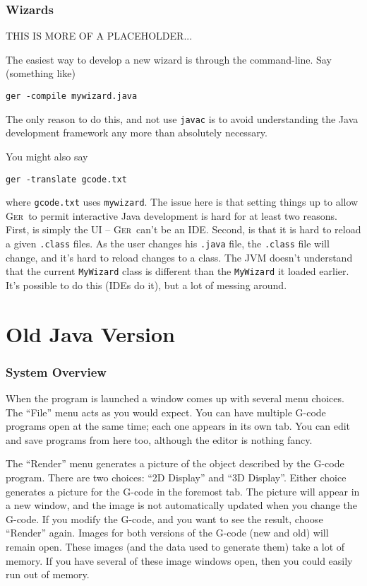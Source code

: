 \documentclass[titlepage,oneside,10pt]{article}
\newcommand{\ger}{\textsc{Ger}}
\begin{document}
\section{Wizards}

THIS IS MORE OF A PLACEHOLDER...

The easiest way to develop a new wizard is through the
command-line. Say (something like)
\begin{verbatim}
ger -compile mywizard.java
\end{verbatim}
The only reason to do this, and not use {\tt javac} is to avoid
understanding the Java development framework any more than absolutely
necessary.

You might also say
\begin{verbatim}
ger -translate gcode.txt
\end{verbatim}
where {\tt gcode.txt} uses {\tt mywizard}. The issue here is that
setting things up to allow \ger\ to permit interactive Java
development is hard for at least two reasons. First, is simply the
UI -- \ger\ can't be an IDE. Second, is that it is hard to reload a
given {\tt .class} files. As the user changes his {\tt .java} file,
the {\tt .class} file will change, and it's hard to reload changes to
a class. The JVM doesn't understand that the current {\tt MyWizard}
class is different than the {\tt MyWizard} it loaded earlier. It's
possible to do this (IDEs do it), but a lot of messing around.


\vskip 2cm





\part{Old Java Version}

\section{System Overview}

When the program is launched a window comes up with several menu
choices. The ``File'' menu acts as you would expect. You can have
multiple G-code programs open at the same time; each one appears in
its own tab. You can edit and save programs from here too, although
the editor is nothing fancy.

The ``Render'' menu generates a picture of the object described by
the G-code program. There are two choices: ``2D Display'' and ``3D
Display''. Either choice generates a picture for the G-code in 
the foremost tab. The picture will appear in a new window, and 
the image is not automatically updated when you change the
G-code. If you modify the G-code, and you want to see the result,
choose ``Render'' again. Images for both versions of the G-code (new
and old) will remain open. These images (and the data used to generate
them) take a lot of memory. If you have several of these image windows
open, then you could easily run out of memory.
\end{document}
